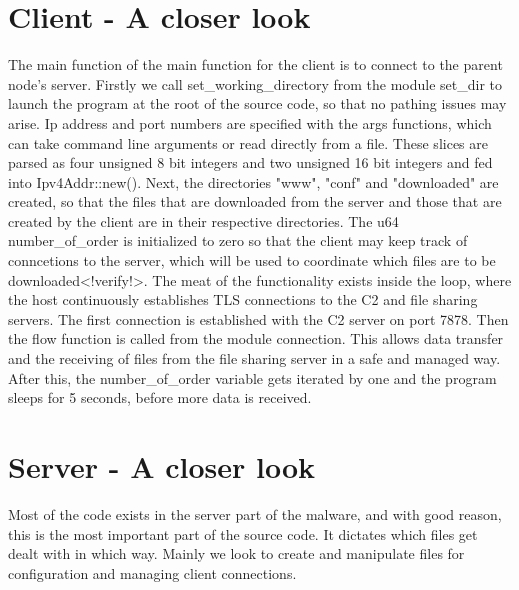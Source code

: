 \documentclass[../main.tex]{subfiles}
\begin{document}
	\vspace{10pt}
	\section{Client - A closer look}


The main function of the main function for the client is to connect to the parent node's server.
Firstly we call set\_working\_directory from the module set\_dir to launch the program at the root of the source code, so that no pathing issues may arise.
Ip address and port numbers are specified with the args functions, which can take command line arguments or read directly from a file. These slices are parsed as four unsigned 8 bit
integers and two unsigned 16 bit integers and fed into Ipv4Addr::new(). Next, the directories "www", "conf" and "downloaded" are created, so that the files that are downloaded from 
the server and those that are created by the client are in their respective directories. The u64 number\_of\_order is initialized to zero so that the client may keep track of conncetions
to the server, which will be used to coordinate which files are to be downloaded<!verify!>. The meat of the functionality exists inside the loop, where the host continuously
establishes TLS connections to the C2 and file sharing servers. The first connection is established with the C2 server on port 7878. Then the flow function is 
called from the module connection. This allows data transfer and the receiving of files from the file sharing server in a safe and managed way. After this, the number\_of\_order variable
gets iterated by one and the program sleeps for 5 seconds, before more data is received.
	\vspace{10pt}

	\section{Server -  A closer look}


Most of the code exists in the server part of the malware, and with good reason, this is the most important part of the source code. It dictates which files get dealt with in which way.
Mainly we look to create and manipulate files for configuration and managing client connections.
\end{document}
